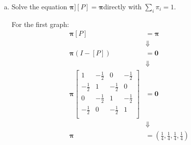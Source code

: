 \documentclass{article}
\begin{document}
    \begin{enumerate}[(a)]
        \item Solve the equation $\bm{\pi]}[P]=\bm{\pi}$directly with $\sum_i\pi_i=1$.
            
        For the first graph:
            \begin{equation*}
                \begin{aligned}
                    \bm{\pi}[P]&=\bm{\pi}\\
                    &\Downarrow\\
                    \bm{\pi}(I-[P])&=\bm{0}\\
                    &\Downarrow\\
                    \bm{\pi}\begin{bmatrix}
                        1 & -\frac{1}{2} & 0 & -\frac{1}{2}\\
                        -\frac{1}{2} & 1 & -\frac{1}{2} & 0\\
                        0 & -\frac{1}{2} & 1 & -\frac{1}{2}\\
                        -\frac{1}{2} & 0 & -\frac{1}{2} & 1\\
                    \end{bmatrix}
                    &=\bm{0}\\
                    &\Downarrow\\
                    \bm{\pi}&=(\frac{1}{4},\frac{1}{4},\frac{1}{4},\frac{1}{4})
                \end{aligned}
            \end{equation*}


\end{enumerate}
\end{document}
